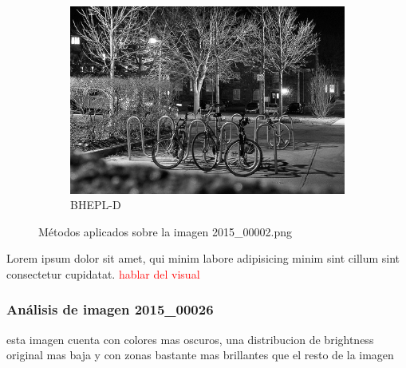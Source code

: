 \documentclass[sigchi]{acmart}
\newcommand{\rojo}[1]{\textcolor{red}{#1}}
\begin{document}
\begin{figure}[htbp]
	\begin{subfigure}[b]{0.32\textwidth}
		\centering
		\includegraphics[width=\linewidth]{./procesadas/2015_00002/2015_00002_bhepl_d.png}
		\caption{BHEPL-D}
	\end{subfigure}

	\caption{Métodos aplicados sobre la imagen 2015\_00002.png}
	\label{fig:visual_002}
\end{figure}

Lorem ipsum dolor sit amet, qui minim labore adipisicing minim sint cillum sint consectetur cupidatat.
\rojo{hablar del visual}

\subsubsection{Análisis de imagen 2015\_00026}

esta imagen cuenta con colores mas oscuros, una distribucion de brightness original mas baja y
con zonas bastante mas brillantes que el resto de la imagen
\end{document}
